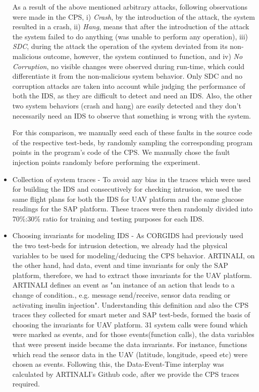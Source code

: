 \begin{itemize}
As a result of the above mentioned arbitrary attacks, following observations were made in the \ac{CPS}, i) \textit{Crash}, by the introduction of the attack, the system resulted in a crash, ii) \textit{Hang}, means that after the introduction of the attack the system failed to do anything (was unable to perform any operation), iii) \textit{\ac{SDC}}, during the attack the operation of the system deviated from its non-malicious outcome, however, the system continued to function, and iv) \textit{No Corruption}, no visible changes were observed during run-time, which could differentiate it from the non-malicious system behavior. Only \ac{SDC} and no corruption attacks are taken into account while judging the performance of both the \ac{IDS}, as they are difficult to detect and need an \ac{IDS}. Also, the other two system behaviors (crash and hang) are easily detected and they don't necessarily need an \ac{IDS} to observe that something is wrong with the system. 

For this comparison, we manually seed each of these faults in the source code of the respective test-beds, by randomly sampling the corresponding program points in the program’s code of the \ac{CPS}. We manually chose the fault injection points randomly before performing the experiment.

\item Collection of system traces - To avoid any bias in the traces which were used for building the \ac{IDS} and consecutively for checking intrusion, we used the same flight plans for both the \ac{IDS} for \ac{UAV} platform and the same glucose readings for the \ac{SAP} platform. These traces were then randomly divided into 70\%:30\% ratio for training and testing purposes for each \ac{IDS}.

\item Choosing invariants for modeling \ac{IDS} - As \ac{CORGIDS} had previously used the two test-beds for intrusion detection, we already had the physical variables to be used for modeling/deducing the \ac{CPS} behavior. ARTINALI, on the other hand, had data, event and time invariants for only the \ac{SAP} platform, therefore, we had to extract those invariants for the \ac{UAV} platform. ARTINALI defines an event as "an instance of an action that leads to a change of condition., e.g. message send/receive, sensor data reading or activating insulin injection". Understanding this definition and also the \ac{CPS} traces they collected for smart meter and \ac{SAP} test-beds, formed the basis of choosing the invariants for \ac{UAV} platform. 31 system calls were found which were marked as events, and for those events(function calls), the data variables that were present inside became the data invariants. For instance, functions which read the sensor data in the \ac{UAV} (latitude, longitude, speed etc) were chosen as events. Following this, the Data-Event-Time interplay was calculated by ARTINALI's Github code\cite{ARTINALI}, after we provide the \ac{CPS} traces required.
\end{itemize}

